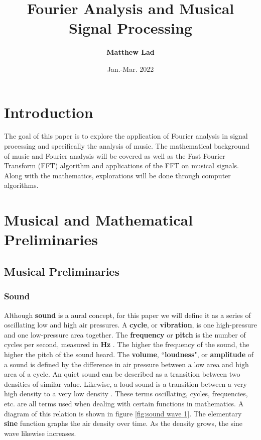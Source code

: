\documentclass[10pt]{article}
\title{
    \textbf{Fourier Analysis and Musical Signal Processing}}
\author{\textbf{Matthew Lad}}
\date{Jan.-Mar. 2022}
\begin{document}
\maketitle

\section{Introduction}
\hspace{\parindent} The goal of this paper is to explore the application of Fourier analysis in signal processing and specifically the analysis of music. The mathematical background of music and Fourier analysis will be covered as well as the Fast Fourier Transform (FFT) algorithm and applications of the FFT on musical signals. Along with the mathematics, explorations will be done through computer algorithms.

\section{Musical and Mathematical Preliminaries}

\subsection{Musical Preliminaries}
\subsubsection{Sound}
\hspace{\parindent}Although \textbf{sound} is a aural concept, for this paper we will define it as a series of oscillating low and high air pressures. A \textbf{cycle}, or \textbf{vibration}, is one high-pressure and one low-pressure area together. The \textbf{frequency} or \textbf{pitch} is the number of cycles per second, measured in \textbf{Hz} \cite{hertzDefinition}. The higher the frequency of the sound, the higher the pitch of the sound heard. The \textbf{volume}, \textquotedblleft\textbf{loudness}", or \textbf{amplitude} of a sound is defined by the difference in air pressure between a low area and high area of a cycle. An quiet sound can be described as a transition between two densities of similar value. Likewise, a loud sound is a transition between a very high density to a very low density \cite{boatwright1956musictheory} \cite{lenssen2014fouriermusic}. These terms oscillating, cycles, frequencies, etc. are all terms used when dealing with certain functions in mathematics. A diagram of this relation is shown in figure \ref{fig:sound wave 1}. The elementary \textbf{sine} function graphs the air density over time. As the density grows, the sine wave likewise increases.
\end{document}
